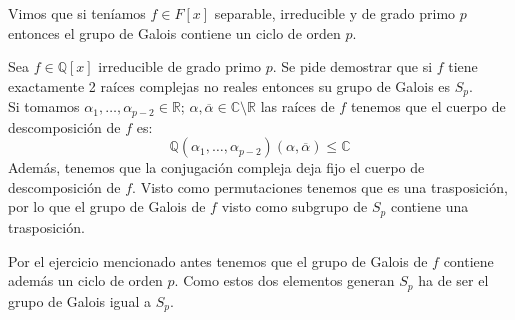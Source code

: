 \noindent
Vimos que si teníamos $f\in F[x]$ separable, irreducible y de grado primo $p$ entonces el grupo de Galois contiene un ciclo de orden $p$.
\begin{ejercicio}
    Sea $f\in \mathbb{Q}[x]$ irreducible de grado primo $p$. Se pide demostrar que si $f$ tiene exactamente 2 raíces complejas no reales entonces su grupo de Galois es $S_p$.\\

    \noindent
    Si tomamos $\alpha_1,\ldots,\alpha_{p-2}\in \mathbb{R}$; $\alpha,\overline{\alpha}\in \mathbb{C}\setminus \mathbb{R}$ las raíces de $f$ tenemos que el cuerpo de descomposición de $f$ es:
    \begin{equation*}
        \mathbb{Q}(\alpha_1,\ldots,\alpha_{p-2})(\alpha,\overline{\alpha}) \leq \mathbb{C}
    \end{equation*}
    Además, tenemos que la conjugación compleja deja fijo el cuerpo de descomposición de $f$. Visto como permutaciones tenemos que es una trasposición, por lo que el grupo de Galois de $f$ visto como subgrupo de $S_p$ contiene una trasposición.

    \noindent
    Por el ejercicio mencionado antes tenemos que el grupo de Galois de $f$ contiene además un ciclo de orden $p$. Como estos dos elementos generan $S_p$ ha de ser el grupo de Galois igual a $S_p$. %
\end{ejercicio}

